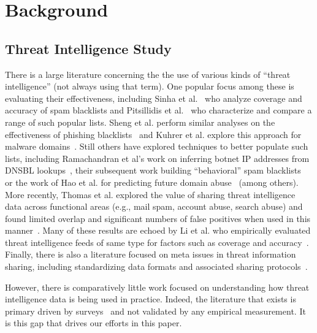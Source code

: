 \section{Background}
\label{sec:background}

\subsection{Threat Intelligence Study}

There is a large literature concerning the the use of various kinds of
``threat intelligence'' (not always using that term). One popular focus among
these is evaluating their effectiveness, including Sinha et
al.~\cite{sinha2008shades} who analyze coverage and accuracy of spam
blacklists and Pitsillidis et al.~\cite{tasters:imc12} who characterize and
compare a range of such popular lists. Sheng et al. perform similar analyses
on the effectiveness of phishing blacklists~\cite{sheng2009empirical} and
Kuhrer et al. explore this approach for malware
domains~\cite{kuhrer2014paint}. Still others have explored techniques to
better populate such lists, including Ramachandran et al's work on inferring
botnet IP addresses from DNSBL lookups~\cite{ramachandran2006revealing},
their subsequent work building ``behavioral'' spam
blacklists~\cite{ramachandran2007filtering} or the work of Hao et al. for
predicting future domain abuse~\cite{hao2016predator,hao2013understanding}
(among others). More recently, Thomas et al. explored the value of sharing
threat intelligence data across functional areas (e.g., mail spam, account
abuse, search abuse) and found limited overlap and significant numbers of
false positives when used in this manner~\cite{thomas2016abuse}. Many of
these results are echoed by Li et al. who empirically evaluated threat
intelligence feeds of same type for factors such as coverage and
accuracy~\cite{li2019reading}. Finally, there is also a literature focused on
meta issues in threat information sharing, including standardizing data
formats and associated sharing protocols~\cite{barnum2012standardizing,
wagner2016misp, mavroeidis2017cyber, burger2014taxonomy}.

However, there is comparatively little work focused on understanding how
threat intelligence data is being used in practice. Indeed, the literature
that exists is primary driven by
surveys~\cite{ponemon2018cti,shackleford2017cyber} and not validated by any
empirical measurement. It is this gap that drives our efforts in this paper.

